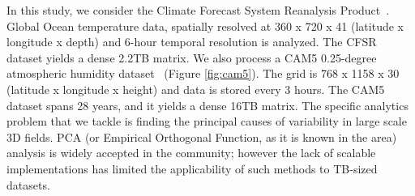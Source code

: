 In this study, we consider the Climate Forecast System Reanalysis Product~\cite{saha:2010}. Global Ocean temperature data, spatially resolved at 360 x 720 x 41 (latitude x longitude x depth) and 6-hour temporal resolution is analyzed. The CFSR dataset yields a dense 2.2TB matrix. We also process a CAM5 0.25-degree atmospheric humidity dataset~\cite{wehner:2014} (Figure  \ref{fig:cam5}). The grid is 768 x 1158 x 30 (latitude x longitude x height) and data is stored every 3 hours. The CAM5 dataset spans 28 years, and it yields a dense 16TB matrix. The specific analytics problem that we tackle is finding the principal causes of variability in large scale 3D fields. PCA (or Empirical Orthogonal Function, as it is known in the area) analysis is widely accepted in the community; however the lack of scalable implementations has limited the applicability of such methods to TB-sized datasets.  




